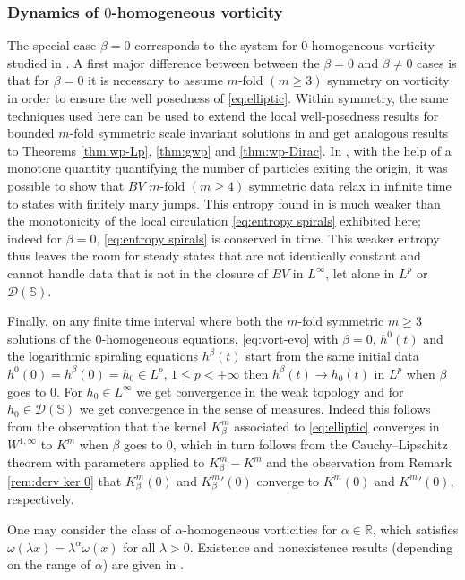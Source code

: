 \documentclass[10pt]{amsart}
\theoremstyle{plain}
\theoremstyle{definition}
\let\alp\alpha
\let\bt\beta
\let\lmb\lambda
\let\omg\omega
\newcommand{\bbR}{\mathbb R}
\begin{document}
\subsubsection*{Dynamics of $0$-homogeneous vorticity}
The special case $\bt=0$ corresponds to the system for $0$-homogeneous vorticity studied in \cite{EJ1,EMS}. A first major difference between between the $\bt=0$ and $\bt\neq 0$ cases is that for $\bt=0$ it is necessary to assume $m$\nobreakdash-fold $(m\geq 3)$ symmetry on vorticity in order to ensure the well posedness of \eqref{eq:elliptic}. Within symmetry, the same techniques used here can be used to extend the local well-posedness results for bounded $m$-fold symmetric scale invariant solutions in \cite{EJ1} and get analogous results to Theorems \ref{thm:wp-Lp}, \ref{thm:gwp} and \ref{thm:wp-Dirac}. In \cite{EMS}, with the help of a monotone quantity quantifying the number of particles exiting the origin, it was possible to show that $BV$ $m$-fold $(m\geq 4)$ symmetric data relax in infinite time to states with finitely many jumps. This entropy found in \cite{EMS} is much weaker than the monotonicity of the local circulation \eqref{eq:entropy spirals} exhibited here; indeed for $\beta=0$, \eqref{eq:entropy spirals} is conserved in time. This weaker entropy thus leaves the room for steady states that are not identically constant and cannot handle data that is not in the closure of $BV$ in $L^\infty$, let alone in $L^p$ or $\mathcal{D}(\mathbb{S})$.

Finally, on any finite time interval where both the $m$-fold symmetric $m\geq 3$ solutions of the $0$-homogeneous equations, \eqref{eq:vort-evo} with $\beta=0$, $h^0(t)$ and the logarithmic spiraling equations $h^\beta(t)$ start from the same initial data $h^0(0)=h^\beta(0)=h_0\in L^p$, $1 \leq p <+\infty$ then $h^\beta(t) \to h_0(t)$ in $L^p$ when $\beta$ goes to $0$. For $h_0 \in L^\infty$ we get convergence in the weak topology and for $h_0 \in \mathcal{D}(\mathbb{S})$ we get convergence in the sense of measures. Indeed this follows from the observation that the kernel $K_\beta^m$ associated to \eqref{eq:elliptic} converges in $W^{1,\infty}$ to $K^m$ when $\beta $ goes to 0, which in turn follows from the Cauchy--Lipschitz theorem with parameters applied to $K^m_\beta-K^m$ and the observation from Remark \ref{rem:derv ker 0} that $K_\beta^m(0)$ and ${K_\beta^m}'(0)$ converge to $K^m(0)$ and ${K^m}'(0)$, respectively.

One may consider the class of $\alpha$-homogeneous vorticities for $\alp\in \bbR$, which satisfies $\omg(\lmb x)= \lmb^\alp \omg(x)$ for all $\lmb>0$. Existence and nonexistence results (depending on the range of $\alp$) are given in \cite{Abe}.
\end{document}
